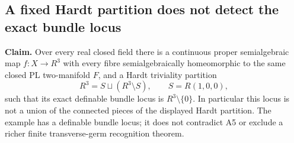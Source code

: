 \subsection*{A fixed Hardt partition does not detect the exact bundle locus}

\textbf{Claim.}\quad
Over every real closed field there is a continuous proper semialgebraic
map $f:X\to R^3$ with every fibre semialgebraically homeomorphic to the
same closed PL two-manifold $F$, and a Hardt triviality partition
\[
 R^3=S\sqcup(R^3\setminus S),\qquad S=R(1,0,0),
\tag{HT.1}
\]
such that its exact definable bundle locus is $R^3\setminus\{0\}$.
In particular this locus is not a union of the connected pieces of the
displayed Hardt partition. The example has a definable bundle locus;
it does not contradict A5 or exclude a richer finite transverse-germ
recognition theorem.

